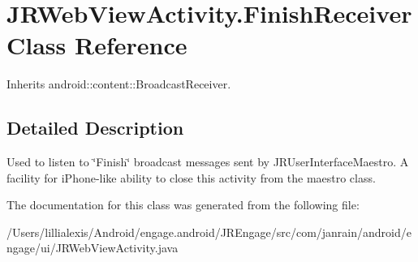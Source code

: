 \hypertarget{classcom_1_1janrain_1_1android_1_1engage_1_1ui_1_1_j_r_web_view_activity_1_1_finish_receiver}{
\section{JRWebViewActivity.FinishReceiver Class Reference}
\label{classcom_1_1janrain_1_1android_1_1engage_1_1ui_1_1_j_r_web_view_activity_1_1_finish_receiver}
}


Inherits android::content::BroadcastReceiver.



\subsection{Detailed Description}
Used to listen to \char`\"{}Finish\char`\"{} broadcast messages sent by JRUserInterfaceMaestro. A facility for iPhone-\/like ability to close this activity from the maestro class. 

The documentation for this class was generated from the following file:\begin{DoxyCompactItemize}
\item 
/Users/lillialexis/Android/engage.android/JREngage/src/com/janrain/android/engage/ui/JRWebViewActivity.java\end{DoxyCompactItemize}
